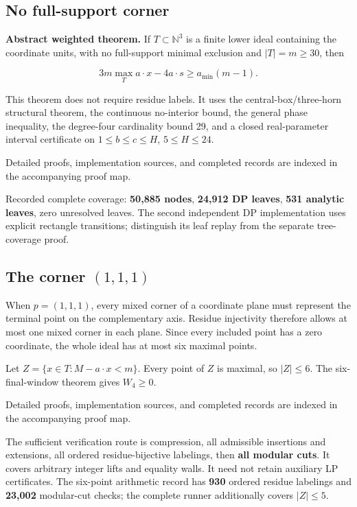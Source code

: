 \documentclass[
  11pt,
  a4paper,
]{article}
\begin{document}
\hypertarget{no-full-support-corner}{%
\subsection{No full-support corner}\label{no-full-support-corner}}

\textbf{Abstract weighted theorem.} If \(T\subset\mathbb N^3\) is a
finite lower ideal containing the coordinate units, with no full-support
minimal exclusion and \(|T|=m\ge30\), then

\[
3m\max_T a\cdot x-4a\cdot s\ge a_{\min}(m-1).
\]

This theorem does not require residue labels. It uses the
central-box/three-horn structural theorem, the continuous no-interior
bound, the general phase inequality, the degree-four cardinality bound
29, and a closed real-parameter interval certificate on
\(1\le b\le c\le H\), \(5\le H\le24\).

Detailed proofs, implementation sources, and completed records are
indexed in the accompanying proof map.

Recorded complete coverage: \textbf{50,885 nodes}, \textbf{24,912 DP
leaves}, \textbf{531 analytic leaves}, zero unresolved leaves. The
second independent DP implementation uses explicit rectangle
transitions; distinguish its leaf replay from the separate tree-coverage
proof.

\hypertarget{the-corner-111}{%
\subsection{\texorpdfstring{The corner
\((1,1,1)\)}{The corner (1,1,1)}}\label{the-corner-111}}

When \(p=(1,1,1)\), every mixed corner of a coordinate plane must
represent the terminal point on the complementary axis. Residue
injectivity therefore allows at most one mixed corner in each plane.
Since every included point has a zero coordinate, the whole ideal has at
most six maximal points.

Let \(Z=\{x\in T:M-a\cdot x<m\}\). Every point of \(Z\) is maximal, so
\(|Z|\le6\). The six-final-window theorem gives \(W_4\ge0\).

Detailed proofs, implementation sources, and completed records are
indexed in the accompanying proof map.

The sufficient verification route is compression, all admissible
insertions and extensions, all ordered residue-bijective labelings, then
\textbf{all modular cuts}. It covers arbitrary integer lifts and
equality walls. It need not retain auxiliary LP certificates. The
six-point arithmetic record has \textbf{930} ordered residue labelings
and \textbf{23,002} modular-cut checks; the complete runner additionally
covers \(|Z|\le5\).
\end{document}

